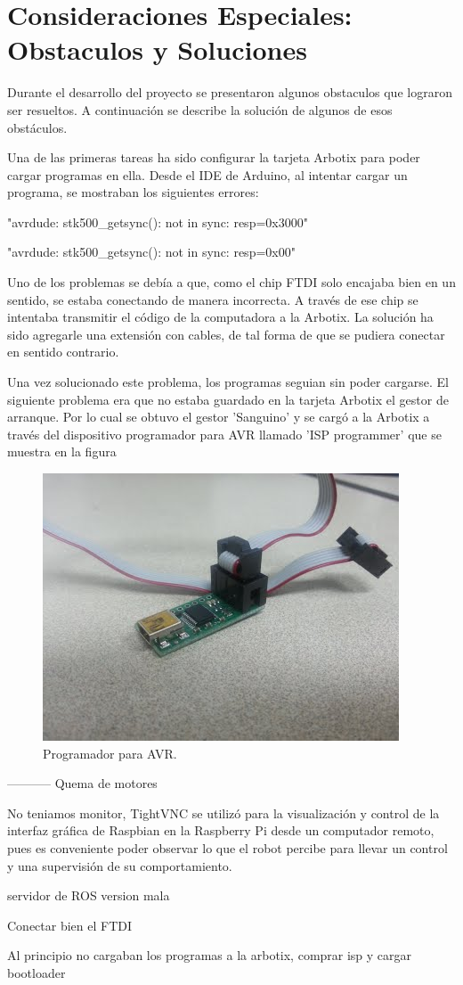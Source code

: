 \chapter{Consideraciones Especiales: Obstaculos y Soluciones} \label{chapter:consideraciones}

Durante el desarrollo del proyecto se presentaron algunos obstaculos que lograron ser resueltos. A continuación se describe la solución de algunos de esos obstáculos. 

Una de las primeras tareas ha sido configurar la tarjeta Arbotix para poder cargar programas en ella. Desde el IDE de Arduino, al intentar cargar un programa, se mostraban los siguientes errores:

"avrdude: stk500\_getsync(): not in sync: resp=0x3000"

"avrdude: stk500\_getsync(): not in sync: resp=0x00"

Uno de los problemas se debía a que, como el chip FTDI solo encajaba bien en un sentido, se estaba conectando de manera incorrecta. A través de ese chip se intentaba transmitir el código de la computadora a la Arbotix. La solución ha sido agregarle una extensión con cables, de tal forma de que se pudiera conectar en sentido contrario. 

Una vez solucionado este problema, los programas seguian sin poder cargarse. El siguiente problema era que no estaba guardado en la tarjeta Arbotix el gestor de arranque. Por lo cual se obtuvo el gestor 'Sanguino' y se cargó a la Arbotix a través del dispositivo programador para AVR llamado 'ISP programmer' que se muestra en la figura 

\begin{figure}[hbtp]
\centering
\includegraphics[scale=0.3]{imagenes/ISP.jpg}
\caption{Programador para AVR.}
\label{fig:trasera1}
\end{figure}

-----------
Quema de motores 

No teniamos monitor, TightVNC se utilizó para la visualización y control de la interfaz gráfica de Raspbian en la Raspberry Pi desde un computador remoto, pues es conveniente poder observar lo que el robot percibe para llevar un control y una supervisión de su comportamiento.

servidor de ROS version mala

Conectar bien el FTDI

Al principio no cargaban los programas a la arbotix, comprar isp y cargar bootloader
